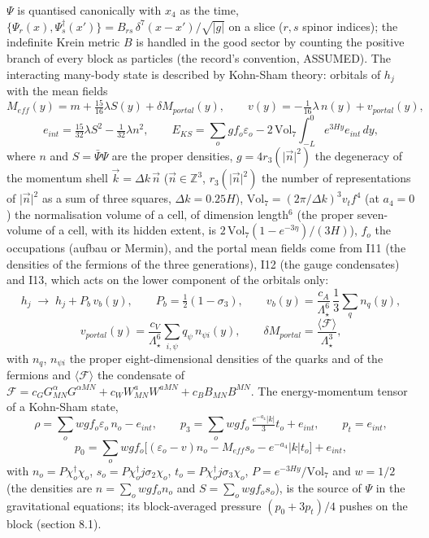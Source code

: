 \documentclass[
  10pt,
]{article}
\begin{document}
\(\Psi\) is quantised canonically with \(x_4\) as the time,
\(\{\Psi_r(x), \Psi_s^\dagger(x')\} = B_{rs}\,\delta^7(x - x')/\sqrt{|g|}\)
on a slice (\(r, s\) spinor indices); the indefinite Krein metric \(B\)
is handled in the good sector by counting the positive branch of every
block as particles (the record's convention, ASSUMED). The interacting
many-body state is described by Kohn-Sham theory: orbitals of \(h_j\)
with the mean fields
\[ M_{eff}(y) = m + \tfrac{15}{16}\lambda S(y) + \delta M_{portal}(y),\qquad v(y) = -\tfrac{1}{16}\lambda\,n(y) + v_{portal}(y), \]
\[ e_{int} = \tfrac{15}{32}\lambda S^2 - \tfrac{1}{32}\lambda n^2,\qquad E_{KS} = \sum_o gf_o\varepsilon_o - 2\,\mathrm{Vol}_7\!\int_{-L}^{0}\!e^{3Hy}e_{int}\,dy ,\]
where \(n\) and \(S = \bar\Psi\Psi\) are the proper densities,
\(g = 4r_3(\lvert\vec n\rvert^2)\) the degeneracy of the momentum shell
\(\vec k = \Delta k\,\vec n\) (\(\vec n \in \mathbb Z^3\),
\(r_3(\lvert\vec n\rvert^2)\) the number of representations of
\(\lvert\vec n\rvert^2\) as a sum of three squares,
\(\Delta k = 0.25H\)), \(\mathrm{Vol}_7 = (2\pi/\Delta k)^3v_tf^4\) (at
\(a_4 = 0\)) the normalisation volume of a cell, of dimension
length\(^6\) (the proper seven-volume of a cell, with its hidden extent,
is \(2\,\mathrm{Vol}_7(1 - e^{-3\eta})/(3H)\)), \(f_o\) the occupations
(aufbau or Mermin), and the portal mean fields come from I11 (the
densities of the fermions of the three generations), I12 (the gauge
condensates) and I13, which acts on the lower component of the orbitals
only:
\[ h_j \;\to\; h_j + P_b\,v_b(y),\qquad P_b = \tfrac12(1 - \sigma_3),\qquad v_b(y) = \frac{c_A}{\Lambda_\star^6}\,\frac13\sum_q n_q(y),\]
\[ v_{portal}(y) = \frac{c_V}{\Lambda_\star^6}\sum_{i,\psi}q_\psi\,n_{\psi i}(y),\qquad \delta M_{portal} = \frac{\langle\mathcal F\rangle}{\Lambda_\star^3}, \]
with \(n_q\), \(n_{\psi i}\) the proper eight-dimensional densities of
the quarks and of the fermions and \(\langle\mathcal F\rangle\) the
condensate of
\(\mathcal F = c_GG^\alpha_{MN}G^{\alpha MN} + c_WW^a_{MN}W^{aMN} + c_BB_{MN}B^{MN}\).
The energy-momentum tensor of a Kohn-Sham state,
\[ \rho = \sum_o wgf_o\varepsilon_o\,n_o - e_{int},\qquad p_3 = \sum_o wgf_o\,\tfrac{e^{-a_4}|k|}{3}t_o + e_{int},\qquad p_t = e_{int},\]
\[ p_0 = \sum_o wgf_o\big[(\varepsilon_o - v)n_o - M_{eff}s_o - e^{-a_4}|k|t_o\big] + e_{int} , \]
with \(n_o = P\chi_o^\dagger\chi_o\),
\(s_o = P\chi_o^\dagger j\sigma_2\chi_o\),
\(t_o = P\chi_o^\dagger j\sigma_3\chi_o\),
\(P = e^{-3Hy}/\mathrm{Vol}_7\) and \(w = 1/2\) (the densities are
\(n = \sum_o wgf_on_o\) and \(S = \sum_o wgf_os_o\)), is the source of
\(\Psi\) in the gravitational equations; its block-averaged pressure
\((p_0 + 3p_t)/4\) pushes on the block (section 8.1).
\end{document}
